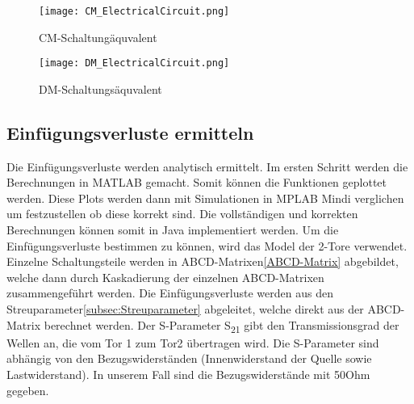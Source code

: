 \begin{figure}[H]
	\centering
	\texttt{[image: CM\_ElectricalCircuit.png]}
	\caption{CM-Schaltungäquvalent}
	\label{fig:CM-Schaltungäquivalent}
\end{figure}

\begin{figure}[H]
	\centering
	\texttt{[image: DM\_ElectricalCircuit.png]}
	\caption{DM-Schaltungsäquvalent}
	\label{fig:DM-Schaltungsäquivalent}
\end{figure}
\newpage
\subsection{Einfügungsverluste ermitteln} \label{subsec:vorgehen}
Die Einfügungsverluste werden analytisch ermittelt. Im ersten Schritt werden die Berechnungen in MATLAB gemacht. Somit können die Funktionen  geplottet werden. Diese Plots werden dann mit Simulationen in MPLAB Mindi verglichen um festzustellen ob diese korrekt sind. Die vollständigen und korrekten Berechnungen können somit in Java implementiert werden. Um die Einfügungsverluste bestimmen zu können, wird das Model der 2-Tore verwendet. Einzelne Schaltungsteile werden in ABCD-Matrixen\ref{ABCD-Matrix} abgebildet, welche dann durch Kaskadierung der einzelnen ABCD-Matrixen zusammengeführt werden. Die Einfügungsverluste werden aus den Streuparameter\ref{subsec:Streuparameter} abgeleitet, welche direkt aus der ABCD-Matrix berechnet werden.
Der S-Parameter S\textsubscript{21} gibt den Transmissionsgrad der Wellen an, die vom Tor 1 zum Tor2 übertragen wird. Die S-Parameter sind abhängig von den Bezugswiderständen (Innenwiderstand der Quelle sowie Lastwiderstand). In unserem Fall sind die Bezugswiderstände mit 50Ohm gegeben.

\newpage
